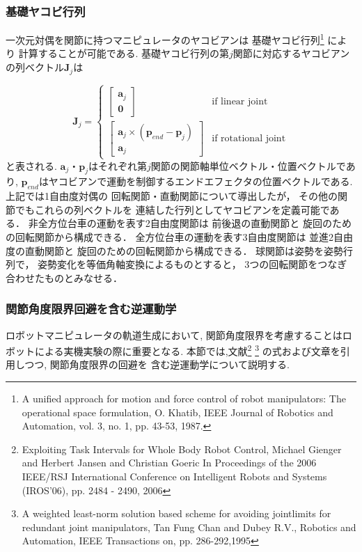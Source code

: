 \subsubsection{基礎ヤコビ行列}
一次元対偶を関節に持つマニピュレータのヤコビアンは
基礎ヤコビ行列\footnote{
A unified approach for motion and force control of robot manipulators:
The operational space formulation,
O. Khatib, IEEE Journal of Robotics and Automation,
vol. 3, no. 1, pp. 43-53, 1987.
}
により
計算することが可能である.
基礎ヤコビ行列の第$j$関節に対応するヤコビアンの列ベクトル$\bm{J}_j$は

\begin{equation}
\label{eq:basic-jacobian-column-vector}
\bm{J}_j=
\begin{cases}
\left[
\begin{array}{ccc}
\bm{a}_j\\
\bm{0}
\end{array}
\right]
& \text{if linear joint} \\
\left[
\begin{array}{ccc}
\bm{a}_j \times (\bm{p}_{end} - \bm{p}_j)\\
\bm{a}_j
\end{array}
\right]
& \text{if rotational joint}
\end{cases}
\end{equation}
と表される.
$\bm{a}_j$・$\bm{p}_j$はそれぞれ第$j$関節の関節軸単位ベクトル・位置ベクトルであり,
$\bm{p}_{end}$はヤコビアンで運動を制御するエンドエフェクタの位置ベクトルである.
上記では1自由度対偶の
回転関節・直動関節について導出したが，
その他の関節でもこれらの列ベクトルを
連結した行列としてヤコビアンを定義可能である．
非全方位台車の運動を表す2自由度関節は
前後退の直動関節と
旋回のための回転関節から構成できる．
全方位台車の運動を表す3自由度関節は
並進2自由度の直動関節と
旋回のための回転関節から構成できる．
球関節は姿勢を姿勢行列で，
姿勢変化を等価角軸変換によるものとすると，
3つの回転関節をつなぎ合わせたものとみなせる．


\subsubsection{関節角度限界回避を含む逆運動学}
ロボットマニピュレータの軌道生成において,
関節角度限界を考慮することはロボットによる実機実験の際に重要となる.
本節では,文献\footnote{
Exploiting Task Intervals for Whole Body Robot Control,
Michael Gienger and Herbert Jansen and Christian Goeric
In Proceedings of the 2006 IEEE/RSJ International Conference on Intelligent Robots and Systems (IROS'06), pp. 2484 - 2490, 2006}
\footnote{
\label{LimitAvoidance:Fung:RA95}
A weighted least-norm solution based scheme for avoiding jointlimits for redundant joint manipulators,
Tan Fung Chan and Dubey R.V.,
Robotics and Automation, IEEE Transactions on,
pp. 286-292,1995
}
の式および文章を引用しつつ, 関節角度限界の回避を
含む逆運動学について説明する.


